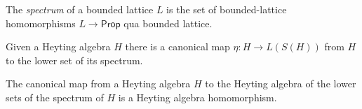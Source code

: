\begin{definition}
    \label{def:spectrum}
    The \emph{spectrum} of a bounded lattice $L$ is the set of bounded-lattice homomorphisms
    $L \to \mathsf{Prop}$ qua bounded lattice.
\end{definition}

\begin{definition}
    \label{def:joyal-eta}
    Given a Heyting algebra $H$ there is a canonical map $\eta : H \to L(S(H))$ from
    $H$ to the lower set of its spectrum.
\end{definition}

\begin{theorem}
    \label{thm:joyal-representation}
    The canonical map from a Heyting algebra $H$ to the Heyting algebra of the lower sets
    of the spectrum of $H$ is a Heyting algebra homomorphism.
\end{theorem}